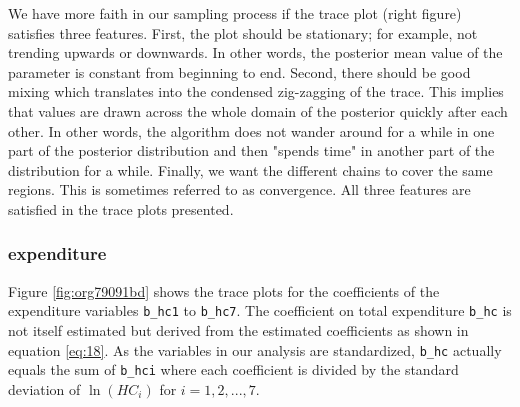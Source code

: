 \documentclass{article}
\begin{document}
We have more faith in our sampling process if the trace plot (right figure) satisfies three features. First, the plot should be stationary; for example, not trending upwards or downwards. In other words, the posterior mean value of the parameter is constant from beginning to end. Second, there should be good mixing which translates into the condensed zig-zagging of the trace. This implies that values are drawn across the whole domain of the posterior quickly after each other. In other words, the algorithm does not wander around for a while in one part of the posterior distribution and then "spends time" in another part of the distribution for a while. Finally, we want the different chains to cover the same regions. This is sometimes referred to as convergence. All three features are satisfied in the trace plots presented.


\subsubsection{expenditure}
\label{sec:org223eae6}
\label{app:expenditure}

Figure \ref{fig:org79091bd} shows the trace plots for the coefficients of the expenditure variables \texttt{b\_hc1} to \texttt{b\_hc7}. The coefficient on total expenditure \texttt{b\_hc} is not itself estimated but derived from the estimated coefficients as shown in equation \eqref{eq:18}. As the variables in our analysis are standardized, \texttt{b\_hc} actually equals the sum of \texttt{b\_hci} where each coefficient is divided by the standard deviation of \(\ln(HC_i)\) for \(i=1,2,...,7\).
\end{document}
